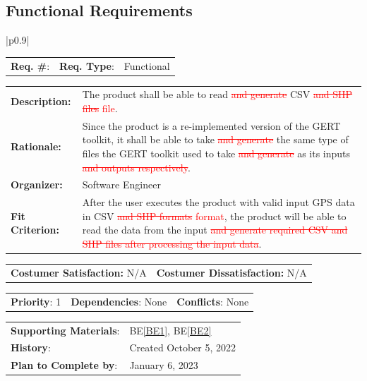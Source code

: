 \documentclass[12pt, titlepage]{article}
\newcommand{\beref}[1]{BE\ref{#1}}
\newcounter{reqnum}
\newcommand{\reqthereqnum}{\textbf{Req. \#}: \thereqnum}
\newenvironment{boxed}
    {\begin{center}
    \begin{tabular}{|p{0.9\textwidth}|}
    \hline\\
    }
    { 
    \\\\\hline
    \end{tabular} 
    \end{center}
    }
\begin{document}
\subsection{Functional Requirements}

\begin{boxed}
\begin{tabular}{l r r}
{reqnum} \reqthereqnum \label{Req1} & {\bf Req. Type}: &  Functional\\
\end{tabular}
\newline
\begin{tabular}{l p{11.5cm}}
    {\bf Description:} & The product shall be able to read \textcolor{red}{\sout{and generate}} CSV \textcolor{red}{\sout{and SHP files} file}.  \\
    {\bf Rationale:} & Since the product is a re-implemented version of the GERT toolkit, it shall be able to take \textcolor{red}{\sout{and generate}} the same type of files the GERT toolkit used to take \textcolor{red}{\sout{and generate}} as its inputs \textcolor{red}{\sout{and outputs respectively}}.\\
    {\bf Organizer:} & Software Engineer\\
    {\bf Fit Criterion:} & After the user executes the product with valid input GPS data in CSV \textcolor{red}{\sout{and SHP formats} format}, the product will be able to read the data from the input \textcolor{red}{\sout{and generate required CSV and SHP files after processing the input data}}.\\
\end{tabular}
\begin{tabular}{l r}
{\bf Costumer Satisfaction:} N/A &  {\bf Costumer Dissatisfaction:}  N/A\\
\end{tabular}
\begin{tabular}{l r r}
    {\bf Priority}: 1 & {\bf Dependencies}: None  & {\bf Conflicts}: None \\
\end{tabular}
\begin{tabular}{l l}
     {\bf Supporting Materials}:& 
     \beref{BE1}, \beref{BE2} \\ 
     {\bf History}: & Created October 5, 2022\\
     {\bf Plan to Complete by}: & January 6, 2023\\
\end{tabular}
\end{boxed}
\end{document}
